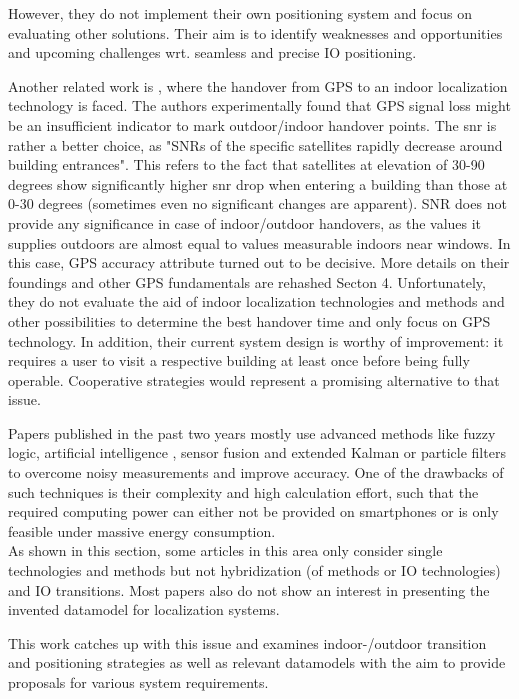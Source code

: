 However, they do not implement their own positioning system and focus on evaluating other solutions. Their aim is to identify weaknesses and opportunities and upcoming challenges wrt. seamless and precise IO positioning.


Another related work is \cite{seamlessGPShandoverStrategy}, where the handover from GPS to an indoor localization technology is faced. The authors experimentally found that GPS signal loss might be an insufficient indicator to mark outdoor/indoor handover points. The \ac{snr} is rather a better choice, as "SNRs of the specific satellites rapidly decrease around building entrances". This refers to the fact that satellites at elevation of 30-90 degrees show significantly higher \ac{snr} drop when entering a building than those at 0-30 degrees (sometimes even no significant changes are apparent).
SNR does not provide any significance in case of indoor/outdoor handovers, as the values it supplies outdoors are almost equal to values measurable indoors near windows. In this case, GPS accuracy attribute turned out to be decisive. 
More details on their foundings and other GPS fundamentals are rehashed Secton 4.
Unfortunately, they do not evaluate the aid of indoor localization technologies and methods and other possibilities to determine the best handover time and only focus on GPS technology. In addition, their current system design is worthy of improvement: it requires a user to visit a respective building at least once before being fully operable. Cooperative strategies would represent a promising alternative to that issue.

Papers published in the past two years mostly use advanced methods like fuzzy logic, artificial intelligence \cite{ai1}, sensor fusion \cite{sensorFusion1} and extended Kalman or particle filters to overcome noisy measurements and improve accuracy. One of the drawbacks of such techniques is their complexity and high calculation effort, such that the required computing power can either not be provided on smartphones or is only feasible under massive energy consumption.\\


As shown in this section, some articles in this area only consider single technologies and methods but not hybridization (of methods or IO technologies) and IO transitions.
Most papers also do not show an interest in presenting the invented datamodel for localization systems.

This work catches up with this issue and examines indoor-/outdoor transition and positioning strategies as well as relevant datamodels with the aim to provide proposals for various system requirements.\\


